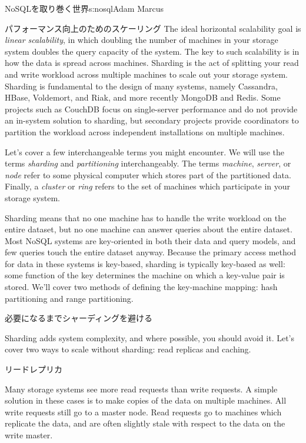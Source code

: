 \begin{aosachapter}{NoSQLを取り巻く世界}{s:nosql}{Adam Marcus}
\begin{aosasect1}{パフォーマンス向上のためのスケーリング}
The ideal horizontal scalability goal is \emph{linear scalability}, in
which doubling the number of machines in your storage system doubles
the query capacity of the system.  The key to such scalability is in
how the data is spread across machines.  Sharding is the act of
splitting your read and write workload across multiple machines to
scale out your storage system.  Sharding is fundamental to the design
of many systems, namely Cassandra, HBase, Voldemort, and Riak, and
more recently MongoDB and Redis.  Some projects such as CouchDB focus
on single-server performance and do not provide an in-system solution
to sharding, but secondary projects provide coordinators to partition
the workload across independent installations on multiple machines.

Let's cover a few interchangeable terms you might encounter.  We will
use the terms \emph{sharding} and \emph{partitioning} interchangeably.
The terms \emph{machine}, \emph{server}, or \emph{node} refer to some
physical computer which stores part of the partitioned data.  Finally,
a \emph{cluster} or \emph{ring} refers to the set of machines which
participate in your storage system.

Sharding means that no one machine has to handle the write workload on
the entire dataset, but no one machine can answer queries about the
entire dataset.  Most NoSQL systems are key-oriented in both their
data and query models, and few queries touch the entire dataset
anyway.  Because the primary access method for data in these systems
is key-based, sharding is typically key-based as well: some function
of the key determines the machine on which a key-value pair is
stored.  We'll cover two methods of defining the key-machine mapping:
hash partitioning and range partitioning.

\begin{aosasect2}{必要になるまでシャーディングを避ける}

Sharding adds system complexity, and where possible, you should avoid
it.  Let's cover two ways to scale without sharding: read replicas and
caching.

\begin{aosasect3}{リードレプリカ}

Many storage systems see more read requests than write requests.  A
simple solution in these cases is to make copies of the data on
multiple machines.  All write requests still go to a master node.
Read requests go to machines which replicate the data, and are often
slightly stale with respect to the data on the write master.


\end{aosasect3}
\end{aosasect2}
\end{aosasect1}
\end{aosachapter}
